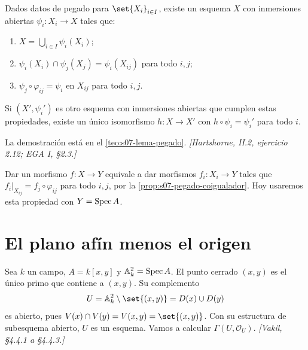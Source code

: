\begin{teo}
\label{teo:s08-lema-pegado}
Dados datos de pegado para $\set{X_i}_{i\in I}$, existe un esquema $X$ con inmersiones abiertas $\psi_i\colon X_i\to X$ tales que:
\begin{enumerate}[label=(\alph*)]
\item $X=\bigcup_{i\in I}\psi_i(X_i)$;
\item $\psi_i(X_i)\cap\psi_j(X_j)=\psi_i(X_{ij})$ para todo $i,j$;
\item $\psi_j\circ\varphi_{ij}=\psi_i$ en $X_{ij}$ para todo $i,j$.
\end{enumerate}
Si $(X',\psi_i')$ es otro esquema con inmersiones abiertas que cumplen estas propiedades, existe un único isomorfismo $h\colon X\to X'$ con $h\circ\psi_i=\psi_i'$ para todo $i$.
\end{teo}
La demostración está en el \cref{teo:s07-lema-pegado}. \emph{[Hartshorne, II.2, ejercicio 2.12; EGA I, \S2.3.]}

\begin{obs}
\label{obs:s08-morfismos-desde-pegado}
Dar un morfismo $f\colon X\to Y$ equivale a dar morfismos $f_i\colon X_i\to Y$ tales que $f_i|_{X_{ij}}=f_j\circ\varphi_{ij}$ para todo $i,j$, por la \cref{prop:s07-pegado-coigualador}. Hoy usaremos esta propiedad con $Y=\operatorname{Spec} A$.
\end{obs}

\begin{center}
\end{center}

\section{El plano afín menos el origen}

\begin{ejem}
\label{ejem:s08-plano-menos-origen}
Sea $k$ un campo, $A=k[x,y]$ y $\mathbb A_k^2=\operatorname{Spec} A$. El punto cerrado $(x,y)$ es el único primo que contiene a $(x,y)$. Su complemento
\[
U=\mathbb A_k^2\setminus\set{(x,y)}=D(x)\cup D(y)
\]
es abierto, pues $V(x)\cap V(y)=V(x,y)=\set{(x,y)}$. Con su estructura de subesquema abierto, $U$ es un esquema. Vamos a calcular $\Gamma(U,\mathcal O_U)$. \emph{[Vakil, \S4.4.1 a \S4.4.3.]}
\end{ejem}

